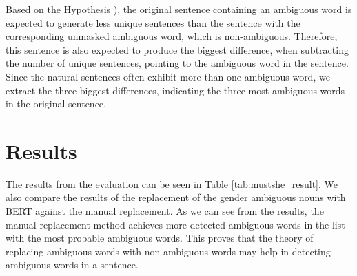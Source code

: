 Based on the Hypothesis ), the original sentence containing an ambiguous word is expected to generate less unique sentences than the sentence with the corresponding unmasked ambiguous word, which is non-ambiguous. Therefore, this sentence is also expected to produce the biggest difference, when subtracting the number of unique sentences, pointing to the ambiguous word in the sentence. Since the natural sentences often exhibit more than one ambiguous word, we extract the three biggest differences, indicating the three most ambiguous words in the original sentence.

\section{Results}
\label{sec:Real_Experiment:Results}

The results from the evaluation can be seen in Table \ref{tab:mustshe_result}. We also compare the results of the replacement of the gender ambiguous nouns with BERT against the manual replacement. As we can see from the results, the manual replacement method achieves more detected ambiguous words in the list with the most probable ambiguous words. This proves that the theory of replacing ambiguous words with non-ambiguous words may help in detecting ambiguous words in a sentence. 



